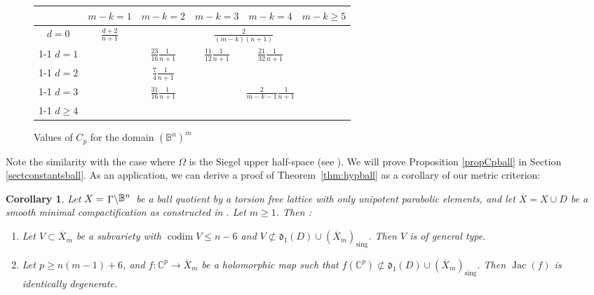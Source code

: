 \documentclass[JEP,XML,SOM,Unicode, NoEqCountersInSection,NoFloatCountersInSection,published]{cedram}
\newenvironment{enumeratea}
{\bgroup\def\theenumi{\alph{enumi}}\begin{enumerate}}
{\end{enumerate}\egroup}
\newcommand{\sing}{\mathrm{sing}}
\DeclareMathOperator{\codim}{codim}
\DeclareMathOperator{\Jac}{Jac}
\theoremstyle{theorem}
\newtheorem{corollary}[proposition]{Corollary}
\theoremstyle{definition}
\newcommand{\quotient}[2]{{\left.\raisebox{-.08em}{$#1$}\middle\backslash\raisebox{.08em}{$#2$}\right.}}
\begin{document}
\begin{figure}[htb]
\centering
\setlength{\tabcolsep}{5pt}
\renewcommand{\arraystretch}{1.5}
\begin{tabular}{|c|c|c|c|c|c|}
\hline
& $m-k = 1$ & $m-k=2$ & $m-k = 3$ & $m-k = 4$ & $m- k \geq 5$ \\
\hline
$d =0$ & \multirow{4}{*}{$\frac{d + 2}{n+1}$} & \multicolumn{4}{c|}{$\frac{2}{(m-k)(n+1)}$} \\
\cline{1-1}\cline{3-6}
$d =1$ & & $\frac{23}{16} \frac{1}{n+1}$ & $\frac{11}{12} \frac{1}{n+1}$ & $\frac{21}{32} \frac{1}{n+1}$ & \\
\cline{1-1}\cline{3-5}
$d = 2$ & & $\frac{7}{4} \frac{1}{n+1}$ & \multicolumn{3}{c|}{} \\
\cline{1-1}\cline{3-3}
$d = 3$ & & $\frac{31}{16} \frac{1}{n+1}$ & \multicolumn{3}{c|}{$\frac{2}{m-k-1} \frac{1}{n+1}$} \\
\cline{1-1}\cline{3-3}
$d \geq 4$ & & \multicolumn{4}{c|}{} \\
\hline
\end{tabular}
\caption{Values of $C_p$ for the domain $(\mathbb B^n)^m$} \label{tablecp}
\end{figure}

Note the similarity with the case where $\Omega$ is the Siegel upper half-space (see \cite[Prop.\,1.4]{cad18}). We will prove Proposition \ref{propCpball} in Section \ref{sectconstantsball}. As an application, we can derive a proof of Theorem~\ref{thm:hypball} as a corollary of our metric criterion:

\begin{corollary} \label{cor:ball} Let $X = \quotient{\Gamma}{\mathbb B^n}$ be a ball quotient by a torsion free lattice with only unipotent parabolic elements, and let $\overline{X} = X \cup D$ be a smooth minimal compactification as constructed in \cite{mok12}. Let $m \geq 1$. Then :
\begin{enumeratea}
\item\label{cor:balla} Let $V \subset \overline{X}_m$ be a subvariety with $\codim  V \leq n - 6$ and $V \not\subset \mathfrak{d}_1(D) \cup (\overline{X}_m)_{\sing}$. Then $V$ is of general type.

\item\label{cor:ballb} Let $p \geq n(m-1) + 6$, and $f : \mathbb C^p \to \overline{X}_m$ be a holomorphic map such that $f(\mathbb C^p) \not\subset \mathfrak{d}_1(D) \cup (\overline{X}_m)_{\sing}$. Then $\Jac(f)$ is identically degenerate.
\end{enumeratea}
\end{corollary}
\end{document}
